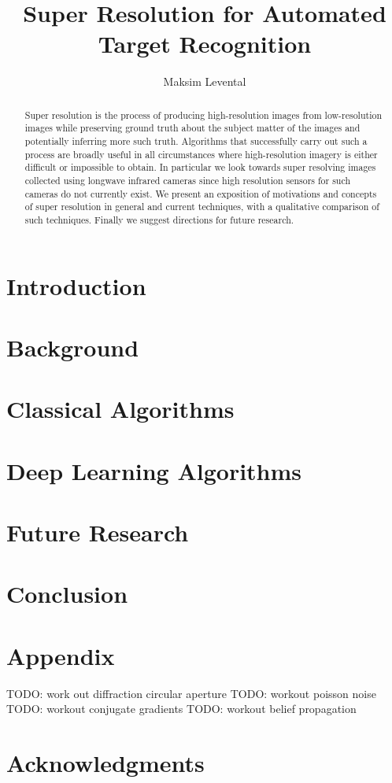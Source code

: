 \documentclass[journal]{IEEEtran}
\begin{document}
    \title{Super Resolution for Automated Target Recognition}
    \author{Maksim Levental}
    \maketitle

    \begin{abstract}
        Super resolution is the process of producing high-resolution images from low-resolution images while preserving ground truth about the subject matter of the images and potentially inferring more such truth.
        Algorithms that successfully carry out such a process are broadly useful in all circumstances where high-resolution imagery is either difficult or impossible to obtain.
        In particular we look towards super resolving images collected using longwave infrared cameras since high resolution sensors for such cameras do not currently exist.
        We present an exposition of motivations and concepts of super resolution in general and current techniques, with a qualitative comparison of such techniques.
        Finally we suggest directions for future research.
    \end{abstract}

    \section{Introduction}\label{sec:introduction}
%    
    \section{Background}\label{sec:background}
%    

    \section{Classical Algorithms}\label{sec:classical-algorithms}
    

    \section{Deep Learning Algorithms}\label{sec:deep-learning-algorithms}
    \section{Future Research}\label{sec:future-research}
    \section{Conclusion}\label{sec:conclusion}
    \section{Appendix}\label{sec:appendix}
    TODO: work out diffraction circular aperture
    TODO: workout poisson noise
    TODO: workout conjugate gradients
    TODO: workout belief propagation
    \section*{Acknowledgments}
    \newpage
    \printbibliography
\end{document}
